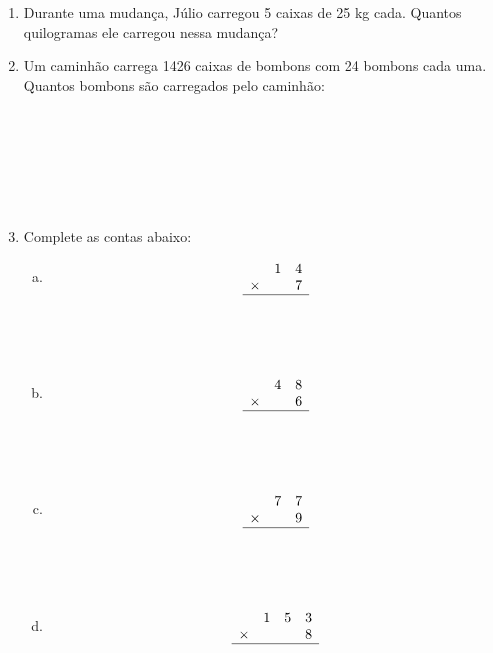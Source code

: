 \documentclass[a4paper,14pt]{article}
\begin{document}
\begin{multicols}{2}
\begin{enumerate}
    		\item Durante uma mudança, Júlio carregou 5 caixas de 25 kg cada. Quantos quilogramas ele carregou nessa mudança? \newpage
    		\item Um caminhão carrega 1426 caixas de bombons com 24 bombons cada uma. Quantos bombons são carregados pelo caminhão: \\\\\\\\\\\\\\
    		\item Complete as contas abaixo:
    		\begin{enumerate}[a)]
    			\item \[
    			\begin{array}{ccc}
    				~ & 1 & 4 \\
    				\times & ~ & 7 \\
    				\hline
    			\end{array}
    			\] \\\\\\
    			\item \[
    			\begin{array}{ccc}
    				~ & 4 & 8 \\
    				\times & ~ & 6 \\
    				\hline
    			\end{array}
    			\] \\\\\\
    			\item \[
    			\begin{array}{ccc}
    				~ & 7 & 7 \\
    				\times & ~ & 9 \\
    				\hline
    			\end{array}
    			\] \\\\\\
    			\item \[
    			\begin{array}{cccc}
    				~ & 1 & 5 & 3 \\
    				\times & ~ & ~ & 8 \\
    				\hline
    			\end{array}
    			\] \\\\\\

\end{enumerate}
\end{enumerate}
\end{multicols}
\end{document}
